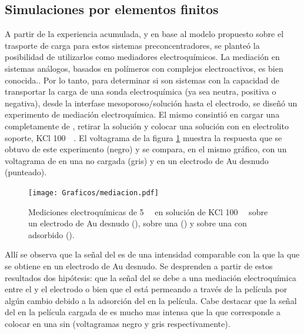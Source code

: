 	\subsection{Simulaciones por elementos finitos}	

		A partir de la experiencia acumulada, y en base al modelo propuesto sobre el trasporte de carga para estos sistemas preconcentradores, se planteó la posibilidad de utilizarlos como mediadores electroquímicos. 
    	La mediación en sistemas análogos, basados en polímeros con complejos electroactivos, es bien conocida.\cite{Kolb1993,ybarra2005}. Por lo tanto, para determinar si son sistemas con la capacidad de transportar la carga de una sonda electroquímica (ya sea neutra, positiva o negativa), desde la interfase mesoporoso/solución hasta el electrodo, se diseñó un experimento de mediación electroquímica. El mismo consintió en cargar una \pdmF\space completamente de \ru, retirar la solución y colocar una solución con \fc\space en electrolito soporte, KCl \SI{100}{\milli\Molar}. El voltagrama de la figura \ref{fig:mediacion} muestra la respuesta que se obtuvo de este experimento (negro) y se compara, en el mismo gráfico, con un voltagrama de \fc\space en una \pdmF\space no cargada (gris) y en un electrodo de Au desnudo (punteado).  

        	\begin{figure}[b!]	
					\centering
			 	    \texttt{[image: Graficos/mediacion.pdf]}
			        \caption[Voltagrama de \ru\space y \fc.]{Mediciones electroquímicas de \fc\space \SI{5}{\milli\Molar} en solución de KCl \SI{100}{\milli\Molar} sobre un electrodo de Au desnudo (\usebox{\punteado}), sobre una \pdmF\space (\usebox{\gris}) y sobre una \pdmF\space con \ru\space adsorbido (\usebox{\negro}).}
			        \label{fig:mediacion}
			      	\end{figure}

		Allí se observa que la señal del \fc\space es de una intensidad comparable con la que la que se obtiene en un electrodo de Au desnudo. Se desprenden a partir de estos resultados dos hipótesis: que la señal del \fc\space se debe a una mediación electroquímica entre el \ru\space y el electrodo o bien que el \fc\space está permeando a través de la película por algún cambio debido a la adsorción del \ru\space en la película. Cabe destacar que la señal del \fc\space en la película cargada de \ru\space es mucho mas intensa que la que corresponde a colocar \fc\space en una \pdmF\space sin \ru\space (voltagramas negro y gris respectivamente).

